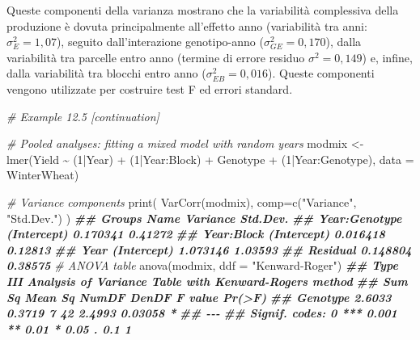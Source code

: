 \documentclass[
  12pt,
]{book}
\newenvironment{Shaded}{\begin{snugshade}}{\end{snugshade}}
\newcommand{\AttributeTok}[1]{\textcolor[rgb]{0.77,0.63,0.00}{#1}}
\newcommand{\CommentTok}[1]{\textcolor[rgb]{0.56,0.35,0.01}{\textit{#1}}}
\newcommand{\DecValTok}[1]{\textcolor[rgb]{0.00,0.00,0.81}{#1}}
\newcommand{\DocumentationTok}[1]{\textcolor[rgb]{0.56,0.35,0.01}{\textbf{\textit{#1}}}}
\newcommand{\FunctionTok}[1]{\textcolor[rgb]{0.00,0.00,0.00}{#1}}
\newcommand{\NormalTok}[1]{#1}
\newcommand{\OtherTok}[1]{\textcolor[rgb]{0.56,0.35,0.01}{#1}}
\newcommand{\SpecialCharTok}[1]{\textcolor[rgb]{0.00,0.00,0.00}{#1}}
\newcommand{\StringTok}[1]{\textcolor[rgb]{0.31,0.60,0.02}{#1}}
\begin{document}
Queste componenti della varianza mostrano che la variabilità complessiva della produzione è dovuta principalmente all'effetto anno (variabilità tra anni: \(\sigma^2_E = 1,07\)), seguito dall'interazione genotipo-anno (\(\sigma^2_{GE} = 0,170\)), dalla variabilità tra parcelle entro anno (termine di errore residuo \(\sigma^2 = 0,149\)) e, infine, dalla variabilità tra blocchi entro anno (\(\sigma^2_{EB} = 0,016\)). Queste componenti vengono utilizzate per costruire test F ed errori standard.

\begin{Shaded}
\begin{Highlighting}[]
\CommentTok{\# Example 12.5 [continuation]}

\CommentTok{\# Pooled analyses: fitting a mixed model with random years}
\NormalTok{modmix }\OtherTok{\textless{}{-}} \FunctionTok{lmer}\NormalTok{(Yield }\SpecialCharTok{\textasciitilde{}}\NormalTok{ (}\DecValTok{1}\SpecialCharTok{|}\NormalTok{Year) }\SpecialCharTok{+}\NormalTok{ (}\DecValTok{1}\SpecialCharTok{|}\NormalTok{Year}\SpecialCharTok{:}\NormalTok{Block) }\SpecialCharTok{+}\NormalTok{ Genotype }\SpecialCharTok{+}
\NormalTok{               (}\DecValTok{1}\SpecialCharTok{|}\NormalTok{Year}\SpecialCharTok{:}\NormalTok{Genotype),}
             \AttributeTok{data =}\NormalTok{ WinterWheat)}

\CommentTok{\# Variance components}
\FunctionTok{print}\NormalTok{( }\FunctionTok{VarCorr}\NormalTok{(modmix), }\AttributeTok{comp=}\FunctionTok{c}\NormalTok{(}\StringTok{"Variance"}\NormalTok{, }\StringTok{"Std.Dev."}\NormalTok{) )}
\DocumentationTok{\#\#  Groups        Name        Variance Std.Dev.}
\DocumentationTok{\#\#  Year:Genotype (Intercept) 0.170341 0.41272 }
\DocumentationTok{\#\#  Year:Block    (Intercept) 0.016418 0.12813 }
\DocumentationTok{\#\#  Year          (Intercept) 1.073146 1.03593 }
\DocumentationTok{\#\#  Residual                  0.148804 0.38575}
\CommentTok{\# ANOVA table}
\FunctionTok{anova}\NormalTok{(modmix, }\AttributeTok{ddf =} \StringTok{"Kenward{-}Roger"}\NormalTok{)}
\DocumentationTok{\#\# Type III Analysis of Variance Table with Kenward{-}Roger\textquotesingle{}s method}
\DocumentationTok{\#\#          Sum Sq Mean Sq NumDF DenDF F value  Pr(\textgreater{}F)  }
\DocumentationTok{\#\# Genotype 2.6033  0.3719     7    42  2.4993 0.03058 *}
\DocumentationTok{\#\# {-}{-}{-}}
\DocumentationTok{\#\# Signif. codes:  0 \textquotesingle{}***\textquotesingle{} 0.001 \textquotesingle{}**\textquotesingle{} 0.01 \textquotesingle{}*\textquotesingle{} 0.05 \textquotesingle{}.\textquotesingle{} 0.1 \textquotesingle{} \textquotesingle{} 1}
\end{Highlighting}
\end{Shaded}
\end{document}
